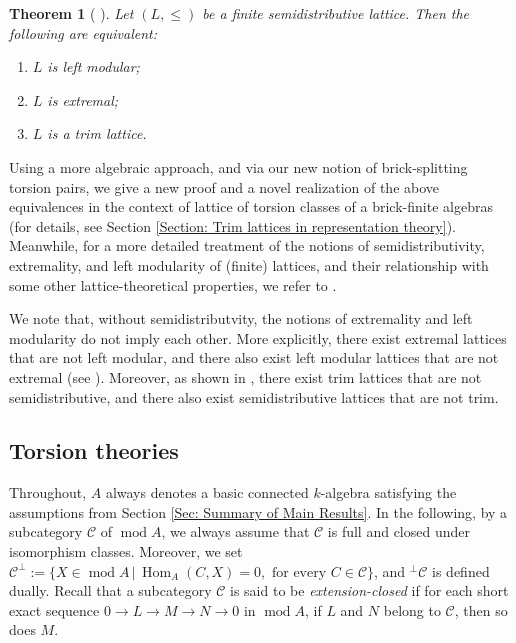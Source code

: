 \documentclass{amsart}
\theoremstyle{thmstyle}
\newtheorem{theorem}[thm]{Theorem}
\theoremstyle{exstyle}
\theoremstyle{defstyle}
\theoremstyle{remstyle}
\theoremstyle{remstyle}
\newcommand{\Hom}{\operatorname{Hom}}
\DeclareMathOperator*{\modu}{mod}
\begin{document}
\begin{theorem}[{\cite[Theorem 1.4]{TW}} {\cite[Theorem 3.2]{Mu}}]\label{Thm: extremal & semidistributive is trim}
Let $(L,\leq)$ be a finite semidistributive lattice. 
Then the following are equivalent:
\begin{enumerate}
    \item $L$ is left modular;
    \item $L$ is extremal;
    \item $L$ is a trim lattice.
\end{enumerate}\end{theorem}

Using a more algebraic approach, and via our new notion of brick-splitting torsion pairs, we give a new proof and a novel realization of the above equivalences in the context of lattice of torsion classes of a brick-finite algebras (for details, see Section \ref{Section: Trim lattices in representation theory}). 
Meanwhile, for a more detailed treatment of the notions of semidistributivity, extremality, and left modularity of (finite) lattices, and their relationship with some other lattice-theoretical properties, we refer to \cite[Figure 2]{Mu}.


We note that, without semidistributvity,  the notions of extremality and left modularity do not imply each other. More explicitly, there exist extremal lattices that are not left modular, and there also exist left modular lattices that are not extremal (see \cite[Figure 5]{TW}). Moreover, as shown in \cite[Figure 3]{TW}, there exist trim lattices that are not semidistributive, and there also exist semidistributive lattices that are not trim.


\subsection{Torsion theories} Throughout, $A$ always denotes a basic connected $k$-algebra satisfying the assumptions from Section \ref{Sec: Summary of Main Results}. In the following, by a subcategory $\mathcal{C}$ of $\modu A$, we always assume that $\mathcal{C}$ is full and closed under isomorphism classes. Moreover, we set $\mathcal{C}^\perp:=\{X \in \modu A\,|\, \Hom_A(C,X)=0, \text{ for every } C \in \mathcal{C}\}$, and ${}^\perp \mathcal{C}$ is defined dually. 
Recall that a subcategory $\mathcal{C}$ is said to be \emph{extension-closed} if for each short exact sequence $0\rightarrow L \rightarrow M \rightarrow N \rightarrow 0$ in $\modu A$, if $L$ and $N$ belong to $\mathcal{C}$, then so does $M$. 
\end{document}
